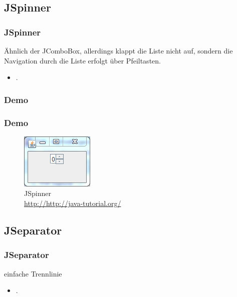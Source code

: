 \documentclass[xcolor=dvipsnames]{beamer}
\begin{document}
\subsection{JSpinner}
\begin{frame} %
  \frametitle{JSpinner
} %
  \begin{block}{Ähnlich der JComboBox, allerdings klappt die Liste nicht auf, sondern die Navigation durch die Liste erfolgt über Pfeiltasten.}
	  \begin{itemize}
		\item .
	  \end{itemize}
  \end{block}
\end{frame}

\subsubsection{Demo}
\begin{frame}
  \frametitle{Demo}
	\begin{figure}
		\includegraphics[scale=1.0]{images/jspinner.PNG}
		\caption{JSpinner \\ \tiny{\textcolor{gray}{\url{http://http://java-tutorial.org/}}}}
		\end{figure}
\end{frame}

\subsection{JSeparator}
\begin{frame} %
  \frametitle{JSeparator
} %
  \begin{block}{einfache Trennlinie}
	  \begin{itemize}
		\item .
	  \end{itemize}
  \end{block}
\end{frame}
\end{document}
